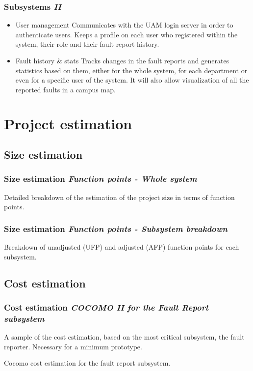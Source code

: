 \documentclass[10pt, compress,usetitleprogressbar,aspectratio=1610]{beamer}
\begin{document}
\begin{frame}
\frametitle{Subsystems \hfill \emph{II}}
\begin{itemize}
\item \alert{User management} Communicates with the UAM login server in order to authenticate users. Keeps a profile on each user who registered within the system, their role and their fault report history.
\item \alert{Fault history \& stats} Tracks changes in the fault reports and generates statistics based on them, either for the whole system, for each department or even for a specific user of the system. It will also allow visualization of all the reported faults in a campus map.
\end{itemize}
\end{frame}

\section{Project estimation}

\subsection{Size estimation}
\begin{frame}
\frametitle{Size estimation \hfill \emph{Function points - Whole system}}
\begin{table}[hbtp]
\centering

\caption{Detailed breakdown of the estimation of the project size in terms of function points.}
\label{tblFunctionPointsSize}
\end{table}
\end{frame}

\begin{frame}
\frametitle{Size estimation \hfill \emph{Function points - Subsystem breakdown}}
\begin{table}[hbtp]
\centering

\caption{Breakdown of unadjusted (UFP) and adjusted (AFP) function points for each subsystem.}
\end{table}
\end{frame}


\subsection{Cost estimation}
\begin{frame}
\frametitle{Cost estimation \hfill \emph{COCOMO II for the Fault Report subsystem}}
A sample of the cost estimation, based on the most critical subsystem, the fault reporter. Necessary for a minimum prototype.

\begin{table}[hbtp]
\centering

\caption{Cocomo cost estimation for the fault report subsystem.}
\label{tblFaultReportCost}
\end{table}
\end{frame}
\end{document}
